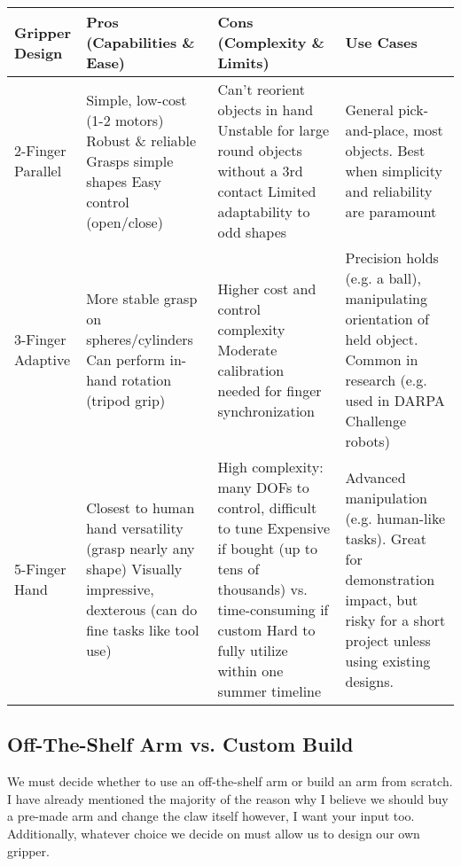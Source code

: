 \documentclass[document]{llncs}
\begin{document}
\begin{table}[H]
\hspace*{-0.9cm}
\label{tab:gripper_design}
\begin{tabular}{|l|p{5cm}|p{5cm}|p{5cm}|}
\hline
\textbf{Gripper Design} & \textbf{Pros (Capabilities \& Ease)} & \textbf{Cons (Complexity \& Limits)} & \textbf{Use Cases} \\
\hline
2-Finger Parallel &
  Simple, low-cost (1-2 motors)\newline 
  Robust \& reliable\newline 
  Grasps simple shapes\newline 
  Easy control (open/close)
& 
  Can’t reorient objects in hand\newline 
  Unstable for large round objects without a 3rd contact\newline
  Limited adaptability to odd shapes
& 
General pick-and-place, most objects. Best when simplicity and reliability are paramount \\
\hline
3-Finger Adaptive & 
  More stable grasp on spheres/cylinders\newline 
  Can perform in-hand rotation (tripod grip)
& 
  Higher cost and control complexity\newline 
  Moderate calibration needed for finger synchronization
& 
Precision holds (e.g. a ball), manipulating orientation of held object. Common in research (e.g. used in DARPA Challenge robots) \\
\hline
5-Finger Hand & 
  Closest to human hand versatility (grasp nearly any shape)\newline 
  Visually impressive, dexterous (can do fine tasks like tool use)
& 
  High complexity: many DOFs to control, difficult to tune
  Expensive if bought (up to tens of thousands) vs. time-consuming if custom\newline
  Hard to fully utilize within one summer timeline
& 
Advanced manipulation (e.g. human-like tasks). Great for demonstration impact, but risky for a short project unless using existing designs. \\
\hline
\end{tabular}
\end{table}

\subsection{Off-The-Shelf Arm vs. Custom Build}
We must decide whether to use an off-the-shelf arm or build an arm from scratch. I have already mentioned the majority of the reason why I believe we should buy a pre-made arm and change the claw itself however, I want your input too. Additionally, whatever choice we decide on must allow us to design our own gripper. 
\end{document}
